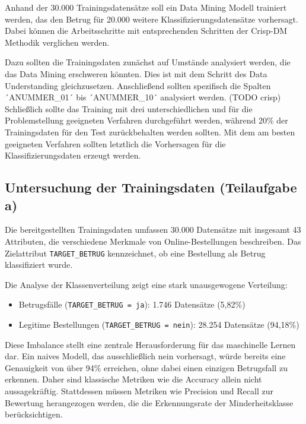 Anhand der 30.000 Trainingsdatensätze soll ein Data Mining Modell trainiert werden, das den Betrug für 20.000 weitere Klassifizierungsdatensätze vorhersagt. Dabei können die Arbeitsschritte mit entsprechenden Schritten der Crisp-DM Methodik verglichen werden.

Dazu sollten die Trainingsdaten zunächst auf Umstände analysiert werden, die das Data Mining erschweren könnten. Dies ist mit dem Schritt des Data Understanding gleichzusetzen.
Anschließend sollten spezifisch die Spalten ´ANUMMER\_01´ bis ´ANUMMER\_10´ analysiert werden. (TODO crisp)
Schließlich sollte das Training mit drei unterschiedlichen und für die Problemstellung geeigneten Verfahren durchgeführt werden, während 20\% der Trainingsdaten für den Test zurückbehalten werden sollten.
Mit dem am besten geeigneten Verfahren sollten letztlich die Vorhersagen für die Klassifizierungsdaten erzeugt werden.



\subsection{Untersuchung der Trainingsdaten (Teilaufgabe a)}

Die bereitgestellten Trainingsdaten umfassen 30.000 Datensätze mit insgesamt 43 Attributen, 
die verschiedene Merkmale von Online-Bestellungen beschreiben. Das Zielattribut 
\texttt{TARGET\_BETRUG} kennzeichnet, ob eine Bestellung als Betrug klassifiziert wurde.

Die Analyse der Klassenverteilung zeigt eine stark unausgewogene Verteilung:
\begin{itemize}
    \item Betrugsfälle (\texttt{TARGET\_BETRUG = ja}): 1.746 Datensätze (5,82\%)
    \item Legitime Bestellungen (\texttt{TARGET\_BETRUG = nein}): 28.254 Datensätze (94,18\%)
\end{itemize}

Diese Imbalance stellt eine zentrale Herausforderung für das maschinelle Lernen dar. 
Ein naives Modell, das ausschließlich \glqq nein\grqq{} vorhersagt, würde bereits eine 
Genauigkeit von über 94\% erreichen, ohne dabei einen einzigen Betrugsfall zu erkennen. 
Daher sind klassische Metriken wie die Accuracy allein nicht aussagekräftig. 
Stattdessen müssen Metriken wie Precision und Recall zur Bewertung 
herangezogen werden, die die Erkennungsrate der Minderheitsklasse berücksichtigen.

